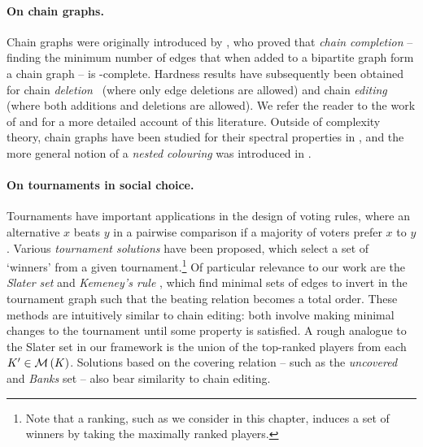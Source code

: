 \paragraph{On chain graphs.}
%
Chain graphs were originally introduced by \textcite{yannakakis1981computing}, who
proved that \emph{chain completion} -- finding the minimum number of edges that
when added to a bipartite graph form a chain graph -- is
-complete. Hardness results have subsequently been obtained
for chain \emph{deletion}~\cite{natanzon2001complexity} (where only edge
deletions are allowed) and chain \emph{editing}~\cite{drange2015threshold}
(where both additions and deletions are allowed). We refer the reader to the
work of \textcite{jiao2017algorithms} and \textcite{drange2015threshold} for a more
detailed account of this literature.
%
Outside of complexity theory, chain graphs have been studied for their spectral
properties in \cite{andelic_2015,ghorbani2017spectral}, and the more general
notion of a \emph{nested colouring} was introduced in \cite{cook2015nested}.

\paragraph{On tournaments in social choice.}
%
Tournaments have important applications in the design of voting rules, where an
alternative $x$ beats $y$ in a pairwise comparison if a majority of voters
prefer $x$ to $y$.  Various \emph{tournament solutions} have been proposed,
which select a set of `winners' from a given tournament.\footnote{Note that a
ranking, such as we consider in this chapter, induces a set of winners by taking
the maximally ranked players.}
%
Of particular relevance to our work are the \emph{Slater set} and
\emph{Kemeney's rule} \cite{brandt2016a}, which find minimal sets of edges to
invert in the tournament graph such that the beating relation becomes a total
order.\footnotemark{}
These methods are intuitively similar to chain editing: both
involve making minimal changes to the tournament until some property is
satisfied. A rough analogue to the Slater set in our framework is the union of
the top-ranked players from each $K' \in \operatorname{\mathcal{M}}\left({K}\right)$. Solutions based on the
covering relation -- such as the \emph{uncovered} and \emph{Banks} set
\cite{brandt2016a} -- also bear similarity to chain editing.


